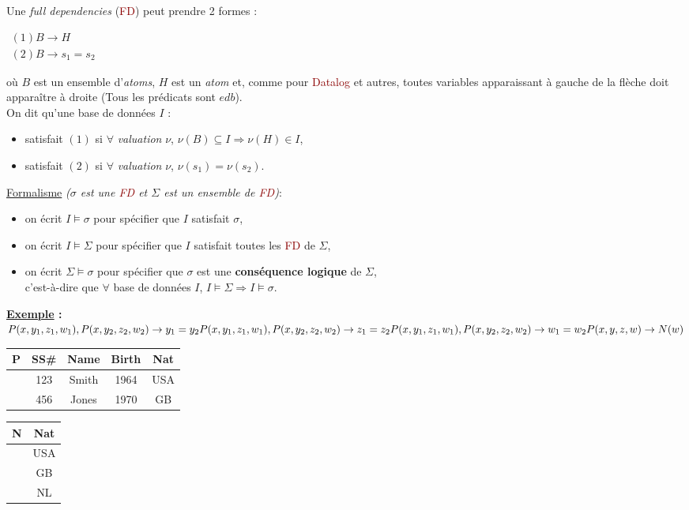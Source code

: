 \documentclass{article}
\newcommand{\red}[1]{\textcolor{darkred}{#1}}
\begin{document}
Une \textit{full dependencies} (\red{FD}) peut prendre 2 formes : 
\begin{center}
	$\begin{array}{l}
	(1) B \rightarrow H \\
	(2) B \rightarrow s_1 = s_2
	\end{array}$
\end{center}
où $B$ est un ensemble d'\textit{atoms}, $H$ est un \textit{atom} et, comme pour \red{Datalog} et autres, toutes variables apparaissant à gauche de la flèche doit apparaître à 
droite (Tous les prédicats sont $edb$).  \\
On dit qu'une base de données $I$ : 
\begin{itemize}
\item satisfait $(1)$ si $\forall$ \textit{valuation} $\nu$, $\nu(B)\subseteq I \Rightarrow \nu(H)\in I$, 
\item satisfait $(2)$ si  $\forall$ \textit{valuation} $\nu$, $\nu(s_1) = \nu(s_2)$.
\end{itemize}
\underline{Formalisme} \textit{($\sigma$ est une \red{FD} et $\Sigma$ est un ensemble de \red{FD})}: 
\begin{itemize}
\item on écrit $I \models \sigma$ pour spécifier que $I$ satisfait $\sigma$,
\item on écrit $I \models \Sigma$ pour spécifier que $I$ satisfait toutes les \red{FD} de $\Sigma$,
\item on écrit $\Sigma \models \sigma$ pour spécifier que $\sigma$ est une \textbf{conséquence logique} de $\Sigma$, \\ 
c'est-à-dire que $\forall$ base de données $I$, $I \models \Sigma \Rightarrow I \models \sigma$. \\
\end{itemize}

\textbf{\underline{Exemple} : } \\

\noindent $P (x, y_1 , z_1 , w_1 ), P (x, y_2 , z_2 , w_2 ) \rightarrow y_1 = y_2 \\
P (x, y_1 , z_1 , w_1 ), P (x, y_2 , z_2 , w_2 ) \rightarrow z_1 = z_2 \\
P (x, y_1 , z_1 , w_1 ), P (x, y_2 , z_2 , w_2 ) \rightarrow w_1 = w_2 \\
                         P (x, y, z, w) \rightarrow N (w)$

\begin{center}
	\begin{tabular}{r|cccc}
	P & SS\# & Name & Birth & Nat\\
	\hline
	& 123 & Smith & 1964 & USA\\
	& 456 & Jones & 1970 & GB\\
	\end{tabular}
	\begin{tabular}{r|c}
	N&Nat\\
	\hline
	& USA\\
	& GB \\
	& NL 
	\end{tabular}
\end{center}
\end{document}
